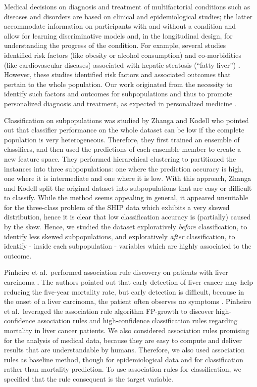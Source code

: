 \documentclass[
  oneside]{book}
\begin{document}
Medical decisions on diagnosis and treatment of multifactorial conditions such as diseases and disorders are based on clinical and epidemiological studies; the latter accommodate information on participants with and without a condition and allow for learning discriminative models and, in the longitudinal design, for understanding the progress of the condition.
For example, several studies identified risk factors (like obesity or alcohol consumption) and co-morbidities (like cardiovascular diseases) associated with hepatic steatosis (``fatty liver'') \autocite{IttermannEtAl:Thyroid2012,LauEtAl:2010,StickelEtAl:2011,Targher:2010,Markus:2013}.
However, these studies identified risk factors and associated outcomes that pertain to the whole population.
Our work originated from the necessity to identify such factors and outcomes for subpopulations and thus to promote personalized diagnosis and treatment, as expected in personalized medicine \autocite{Hingorani:2013,Voelzke:Cardiol2013}.

Classification on subpopulations was studied by Zhanga and Kodell \autocite{AIM13} who pointed out that classifier performance on the whole dataset can be low if the complete population is very heterogeneous.
Therefore, they first trained an ensemble of classifiers, and then used the predictions of each ensemble member to create a new feature space.
They performed hierarchical clustering to partitioned the instances into three subpopulations: one where the prediction accuracy is high, one where it is intermediate and one where it is low.
With this approach, Zhanga and Kodell split the original dataset into subpopulations that are easy or difficult to classify.
While the method seems appealing in general, it appeared unsuitable for the three-class problem of the SHIP data which exhibits a very skewed distribution, hence it is clear that low classification accuracy is (partially) caused by the skew.
Hence, we studied the dataset exploratively \emph{before} classification, to identify less skewed subpopulations, and exploratively \emph{after} classification, to identify - inside each subpopulation - variables which are highly associated to the outcome.

Pinheiro et al.~performed association rule discovery on patients with liver carcinoma \autocite{PinheiroEtAl:ICCABS13}.
The authors pointed out that early detection of liver cancer may help reducing the five-year mortality rate, but early detection is difficult, because in the onset of a liver carcinoma, the patient often observes no symptoms \autocite{PinheiroEtAl:ICCABS13}.
Pinheiro et al.~leveraged the association rule algorithm FP-growth \autocite{Han:FPGrowth00} to discover high-confidence association rules and high-confidence classification rules regarding mortality in liver cancer patients.
We also considered association rules promising for the analysis of medical data, because they are easy to compute and deliver results that are understandable by humans.
Therefore, we also used association rules as baseline method, though for epidemiological data and for classification rather than mortality prediction.
To use association rules for classification, we specified that the rule consequent is the target variable.
\end{document}
